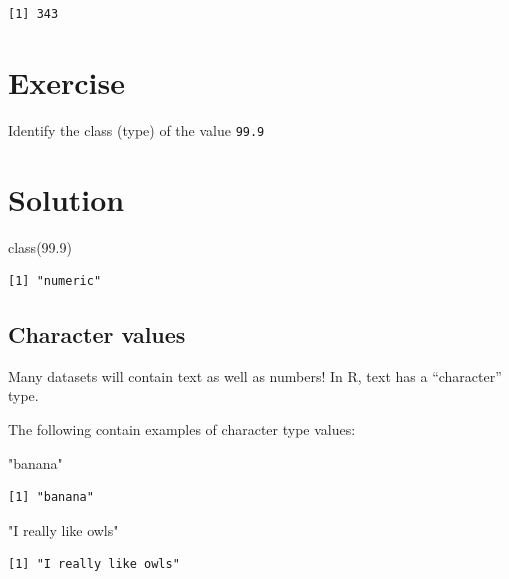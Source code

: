 \documentclass[
  letterpaper,
  DIV=11,
  numbers=noendperiod]{scrreprt}
\newenvironment{Shaded}{\begin{snugshade}}{\end{snugshade}}
\newcommand{\FloatTok}[1]{\textcolor[rgb]{0.68,0.00,0.00}{#1}}
\newcommand{\FunctionTok}[1]{\textcolor[rgb]{0.28,0.35,0.67}{#1}}
\newcommand{\NormalTok}[1]{\textcolor[rgb]{0.00,0.23,0.31}{#1}}
\newcommand{\StringTok}[1]{\textcolor[rgb]{0.13,0.47,0.30}{#1}}
\begin{document}
\begin{verbatim}
[1] 343
\end{verbatim}

\section{Exercise}

Identify the class (type) of the value \texttt{99.9}

\section{Solution}

\begin{Shaded}
\begin{Highlighting}[]
\FunctionTok{class}\NormalTok{(}\FloatTok{99.9}\NormalTok{)}
\end{Highlighting}
\end{Shaded}

\begin{verbatim}
[1] "numeric"
\end{verbatim}

\subsection{Character values}\label{character-values}

Many datasets will contain text as well as numbers! In R, text has a
``character'' type.

The following contain examples of character type values:

\begin{Shaded}
\begin{Highlighting}[]
\StringTok{"banana"}
\end{Highlighting}
\end{Shaded}

\begin{verbatim}
[1] "banana"
\end{verbatim}

\begin{Shaded}
\begin{Highlighting}[]
\StringTok{"I really like owls"}
\end{Highlighting}
\end{Shaded}

\begin{verbatim}
[1] "I really like owls"
\end{verbatim}
\end{document}

